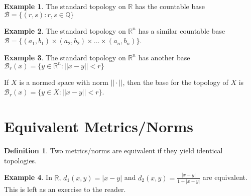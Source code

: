 \documentclass{article}
\theoremstyle{definition}
\newtheorem{definition}{Definition}
\newtheorem{exampled}{Example}[definition]
\begin{document}
\begin{exampled}
	The standard topology on $\mathbb{R}$ has the countable base $\mathcal{B}=\{(r, s) : r, s \in \mathbb{Q}\}$
\end{exampled}
\begin{exampled}
	The standard topology on $\mathbb{R}^n$ has a similar countable base $\mathcal{B}=\{(a_1, b_1)\times(a_2, b_2)\times\dots\times(a_n, b_n)\}$.
\end{exampled}
\begin{exampled}
	The standard topology on $\mathbb{R}^n$ has another base $\mathcal{B}_r(x)=\{y\in\mathbb{R}^n:||x-y||<r\}$
\end{exampled}

\noindent
If $X$ is a normed space with norm $||\cdot||$, then the base for the topology of $X$ is $\mathcal{B}_r(x)=\{y\in X:||x-y||<r\}$.

\section{Equivalent Metrics/Norms}
\begin{definition}
	Two metrics/norms are equivalent if they yield identical topologies.
\end{definition}
\begin{exampled}
	In $\mathbb{R}$, $d_1(x, y)=|x-y|$ and $d_2(x, y)=\frac{|x-y|}{1+|x-y|}$ are equivalent. This is left as an exercise to the reader.
\end{exampled}%
\end{document}
